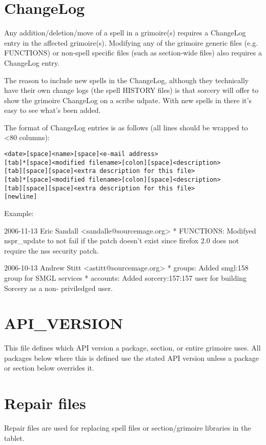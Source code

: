 \documentclass[a4paper,10pt]{book}
\begin{document}
\section{ChangeLog}
Any addition/deletion/move of a spell in a grimoire(s) requires a ChangeLog
entry in the affected grimoire(s). Modifying any of the grimoire generic
files (e.g. FUNCTIONS) or non-spell specific files (such as section-wide
files) also requires a ChangeLog entry.

The reason to include new spells in the ChangeLog, although they technically
have their own change logs (the spell HISTORY files) is that sorcery will offer
to show the grimoire ChangeLog on a scribe udpate. With new spells in there
it's easy to see what's been added.

The format of ChangeLog entries is as follows (all lines should be wrapped
to <80 columns):
\begin{verbatim}
<date>[space]<name>[space]<e-mail address>
[tab]*[space]<modified filename>[colon][space]<description>
[tab][space][space]<extra description for this file>
[tab]*[space]<modified filename>[colon][space]<description>
[tab][space][space]<extra description for this file>
[newline]
\end{verbatim}

Example:
\begin{verbatim*}
2006-11-13 Eric Sandall <sandalle@sourcemage.org>
	* FUNCTIONS: Modifyed nspr_update to not fail if the patch doesn't
	  exist	since firefox 2.0 does not require the nss security patch.

2006-10-13 Andrew Stitt <astitt@sourcemage.org>
	* groups: Added smgl:158 group for SMGL services
	* accounts: Added sorcery:157:157 user for building Sorcery as a non-
	  priviledged user.
\end{verbatim*}

\section{API\_VERSION}
This file defines which API version a package, section, or entire grimoire
uses. All packages below where this is defined use the stated API version
unless a package or section below overrides it.

\section{Repair files}
Repair files are used for replacing spell files or section/grimoire libraries
in the tablet.
\end{document}
